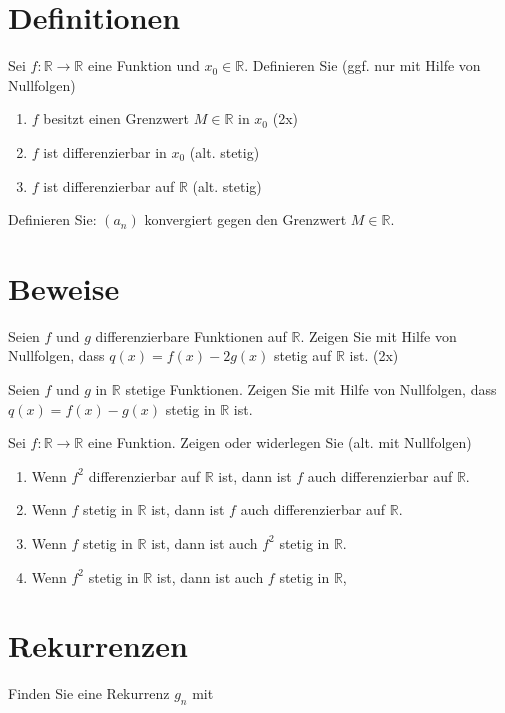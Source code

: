 \documentclass{article}
\begin{document}
\section*{Definitionen}

Sei $f: \mathbb{R} \to \mathbb{R}$ eine Funktion und $x_0 \in \mathbb{R}$. Definieren Sie (ggf. nur mit Hilfe von Nullfolgen)
\begin{enumerate}
    \item $f$ besitzt einen Grenzwert $M \in \mathbb{R}$ in $x_0$ (2x)
    \item $f$ ist differenzierbar in $x_0$ (alt. stetig)
    \item $f$ ist differenzierbar auf $\mathbb{R}$ (alt. stetig)
\end{enumerate}

Definieren Sie: $(a_n)$ konvergiert gegen den Grenzwert $M \in \mathbb{R}$.

\section*{Beweise}

Seien $f$ und $g$ differenzierbare Funktionen auf $\mathbb{R}$. Zeigen Sie mit Hilfe von Nullfolgen, dass $q(x) = f(x) - 2g(x)$ stetig auf $\mathbb{R}$ ist. (2x)

Seien $f$ und $g$ in $\mathbb{R}$ stetige Funktionen. Zeigen Sie mit Hilfe von Nullfolgen, dass $q(x) = f(x) - g(x)$ stetig in $\mathbb{R}$ ist.

Sei $f : \mathbb{R} \to \mathbb{R}$ eine Funktion. Zeigen oder widerlegen Sie (alt. mit Nullfolgen)
\begin{enumerate}
    \item Wenn $f^2$ differenzierbar auf $\mathbb{R}$ ist, dann ist $f$ auch differenzierbar auf $\mathbb{R}$.
    \item Wenn $f$ stetig in $\mathbb{R}$ ist, dann ist $f$ auch differenzierbar auf $\mathbb{R}$.
    \item Wenn $f$ stetig in $\mathbb{R}$ ist, dann ist auch $f^2$ stetig in $\mathbb{R}$.
    \item Wenn $f^2$ stetig in $\mathbb{R}$ ist, dann ist auch $f$ stetig in $\mathbb{R}$,
\end{enumerate}

\section*{Rekurrenzen}

Finden Sie eine Rekurrenz $g_n$ mit
\end{document}
